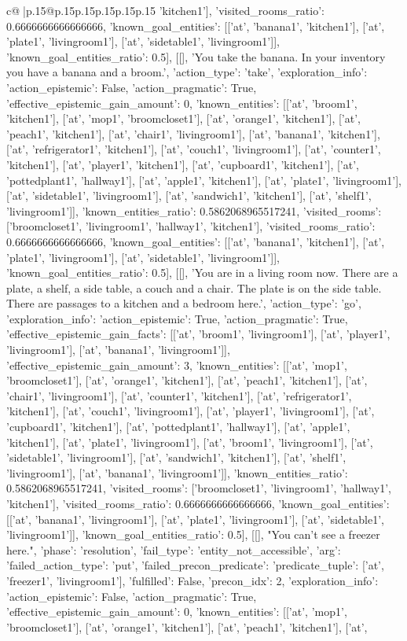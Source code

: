\documentclass{article}
\begin{document}
{\begin{supertabular}{c@{$\;$}|p{.15\linewidth}@{}p{.15\linewidth}p{.15\linewidth}p{.15\linewidth}p{.15\linewidth}p{.15\linewidth}}
{{{'kitchen1'], 'visited_rooms_ratio': 0.6666666666666666, 'known_goal_entities': [['at', 'banana1', 'kitchen1'], ['at', 'plate1', 'livingroom1'], ['at', 'sidetable1', 'livingroom1']], 'known_goal_entities_ratio': 0.5}}], [[], 'You take the banana. In your inventory you have a banana and a broom.\n', {'action_type': 'take', 'exploration_info': {'action_epistemic': False, 'action_pragmatic': True, 'effective_epistemic_gain_amount': 0, 'known_entities': [['at', 'broom1', 'kitchen1'], ['at', 'mop1', 'broomcloset1'], ['at', 'orange1', 'kitchen1'], ['at', 'peach1', 'kitchen1'], ['at', 'chair1', 'livingroom1'], ['at', 'banana1', 'kitchen1'], ['at', 'refrigerator1', 'kitchen1'], ['at', 'couch1', 'livingroom1'], ['at', 'counter1', 'kitchen1'], ['at', 'player1', 'kitchen1'], ['at', 'cupboard1', 'kitchen1'], ['at', 'pottedplant1', 'hallway1'], ['at', 'apple1', 'kitchen1'], ['at', 'plate1', 'livingroom1'], ['at', 'sidetable1', 'livingroom1'], ['at', 'sandwich1', 'kitchen1'], ['at', 'shelf1', 'livingroom1']], 'known_entities_ratio': 0.5862068965517241, 'visited_rooms': ['broomcloset1', 'livingroom1', 'hallway1', 'kitchen1'], 'visited_rooms_ratio': 0.6666666666666666, 'known_goal_entities': [['at', 'banana1', 'kitchen1'], ['at', 'plate1', 'livingroom1'], ['at', 'sidetable1', 'livingroom1']], 'known_goal_entities_ratio': 0.5}}], [[], 'You are in a living room now. There are a plate, a shelf, a side table, a couch and a chair. The plate is on the side table. There are passages to a kitchen and a bedroom here.\n', {'action_type': 'go', 'exploration_info': {'action_epistemic': True, 'action_pragmatic': True, 'effective_epistemic_gain_facts': [['at', 'broom1', 'livingroom1'], ['at', 'player1', 'livingroom1'], ['at', 'banana1', 'livingroom1']], 'effective_epistemic_gain_amount': 3, 'known_entities': [['at', 'mop1', 'broomcloset1'], ['at', 'orange1', 'kitchen1'], ['at', 'peach1', 'kitchen1'], ['at', 'chair1', 'livingroom1'], ['at', 'counter1', 'kitchen1'], ['at', 'refrigerator1', 'kitchen1'], ['at', 'couch1', 'livingroom1'], ['at', 'player1', 'livingroom1'], ['at', 'cupboard1', 'kitchen1'], ['at', 'pottedplant1', 'hallway1'], ['at', 'apple1', 'kitchen1'], ['at', 'plate1', 'livingroom1'], ['at', 'broom1', 'livingroom1'], ['at', 'sidetable1', 'livingroom1'], ['at', 'sandwich1', 'kitchen1'], ['at', 'shelf1', 'livingroom1'], ['at', 'banana1', 'livingroom1']], 'known_entities_ratio': 0.5862068965517241, 'visited_rooms': ['broomcloset1', 'livingroom1', 'hallway1', 'kitchen1'], 'visited_rooms_ratio': 0.6666666666666666, 'known_goal_entities': [['at', 'banana1', 'livingroom1'], ['at', 'plate1', 'livingroom1'], ['at', 'sidetable1', 'livingroom1']], 'known_goal_entities_ratio': 0.5}}], [[], "You can't see a freezer here.\n", {'phase': 'resolution', 'fail_type': 'entity_not_accessible', 'arg': {'failed_action_type': 'put', 'failed_precon_predicate': {'predicate_tuple': ['at', 'freezer1', 'livingroom1'], 'fulfilled': False, 'precon_idx': 2}}, 'exploration_info': {'action_epistemic': False, 'action_pragmatic': True, 'effective_epistemic_gain_amount': 0, 'known_entities': [['at', 'mop1', 'broomcloset1'], ['at', 'orange1', 'kitchen1'], ['at', 'peach1', 'kitchen1'], ['at', }}}
\end{supertabular}}
\end{document}
